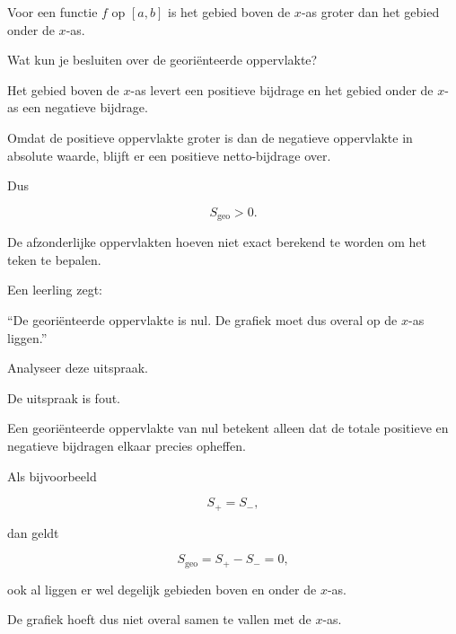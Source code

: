 \documentclass{ximera}
\begin{document}
\begin{oefening}{\oefU\ESS}

Voor een functie \(f\) op \([a,b]\) is het gebied boven de \(x\)-as
groter dan het gebied onder de \(x\)-as.

Wat kun je besluiten over de georiënteerde oppervlakte?

\begin{oplossing}

Het gebied boven de \(x\)-as levert een positieve bijdrage en het gebied
onder de \(x\)-as een negatieve bijdrage.

Omdat de positieve oppervlakte groter is dan de negatieve oppervlakte
in absolute waarde, blijft er een positieve netto-bijdrage over.

Dus

\[
\boxed{S_{\mathrm{geo}}>0}.
\]

De afzonderlijke oppervlakten hoeven niet exact berekend te worden om
het teken te bepalen.

\end{oplossing}

\end{oefening}



\begin{oefening}{\oefU\ESS}

Een leerling zegt:

``De georiënteerde oppervlakte is nul. De grafiek moet dus overal op de
\(x\)-as liggen.''

Analyseer deze uitspraak.

\begin{oplossing}

De uitspraak is fout.

Een georiënteerde oppervlakte van nul betekent alleen dat de totale
positieve en negatieve bijdragen elkaar precies opheffen.

Als bijvoorbeeld

\[
S_+=S_-,
\]

dan geldt

\[
S_{\mathrm{geo}}
=
S_+-S_-
=
0,
\]

ook al liggen er wel degelijk gebieden boven en onder de \(x\)-as.

De grafiek hoeft dus niet overal samen te vallen met de \(x\)-as.

\end{oplossing}

\end{oefening}
\end{document}
